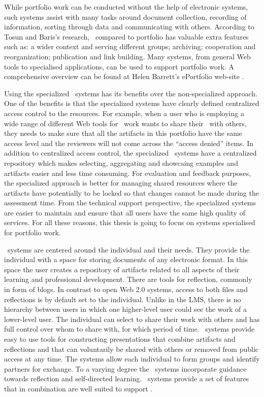 While portfolio work can be conducted without the help of electronic systems,
such systems assist with many tasks around document collection, recording of
information, sorting through data and communicating with others. According to
Tosun and Baris's \citeyearpar{Tosun2011} research, \ep~compared to portfolio
has valuable extra features such as: a wider context and serving different
groups; archiving; cooperation and reorganization; publication and link building.
Many systems, from general Web tools to specialised applications, can be used to
support portfolio work. A comprehensive overview can be found at Helen Barrett's
ePortfolio web-site \citep{Barrett2008}. 

Using the specialized \ep~systems has its benefits over the non-specialized
approach. One of the benefits is that the specialized systems have clearly
defined centralized access control to the resources. For example, when a user
who is employing a wide range of different Web tools for \ep~work wants to share
their \ep~with others, they needs to make sure that all the artifacts in this
portfolio have the same access level and the reviewers will not come across the
``access denied'' items. In addition to centralized access control, the
specialized \ep~systems have a centralized repository which makes selecting,
aggregating and showcaing examples and artifacts easier and less time consuming.
For evaluation and feedback purposes, the specialized approach is better for 
managing shared resources where the artifacts have potentially to be locked so
that changes cannot be made during the assessment time. From the technical
support perspective, the specialized systems are easier to maintain and ensure
that all users have the same high quality of services. For all these reasons,
this thesis is going to focus on systems specialised for portfolio work.

\ep~systems are centered around the individual and their needs. They provide the
individual with a space for storing documents of any electronic format. In this
space the user creates a repository of artifacts related to all aspects of their
learning and professional development. There are tools for reflection, commonly
in form of blogs. In contrast to open Web 2.0 systems, access to both files and
reflections is by default set to the individual. Unlike in the LMS, there is no
hierarchy between users in which one higher-level user could see the work of a
lower-level user. The individual can select to share their work with others and
has full control over whom to share with, for which period of time. \ep~systems
provide easy to use tools for constructing presentations that combine artifacts
and reflections and that can voluntarily be shared with others or removed from
public access at any time. The systems allow each individual to form groups and
identify partners for exchange. To a varying degree the \ep~systems incorporate
guidance towards reflection and self-directed learning. \ep~systems provide a
set of features that in combination are well suited to support \LLLsn. 

